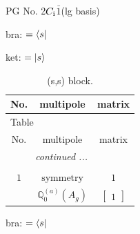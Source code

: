 \documentclass[fleqn,8pt,landscape]{jsarticle}
\begin{document}
\setcounter{MaxMatrixCols}{32}

\renewcommand{\tablename}{Table~}
\renewcommand{\figurename}{Figure~}
\begin{center}
\LARGE
PG No. 2\quad$C_{\rm i}$\quad$\bar{1}$\quad[ triclinic ] (lg basis)
\end{center}
bra: $=\bra{s}$

\noindent
ket: $=\ket{s}$
\renewcommand{\arraystretch}{1.6}
\begin{longtable}{ccc}
\caption{(s,s) block.}
 \\
 \hline \hline
No. & multipole & matrix \\ \hline \endfirsthead

\multicolumn{2}{l}{\tablename\ \thetable{}} \\
 \hline \hline
No. & multipole & matrix \\ \hline \endhead

 \hline \hline
\multicolumn{2}{r}{\footnotesize\it continued ...} \\ \endfoot

 \hline \hline
\multicolumn{2}{r}{} \\ \endlastfoot

$ 1 $ & $ \text{symmetry} $ & $ 1 $ \\
$  $ & $ \mathbb{Q}_{0}^{(a)}(A_{g}) $ & $ \begin{bmatrix} 1 \end{bmatrix} $ \\ \hline
\end{longtable}
bra: $=\bra{s}$
\end{document}
